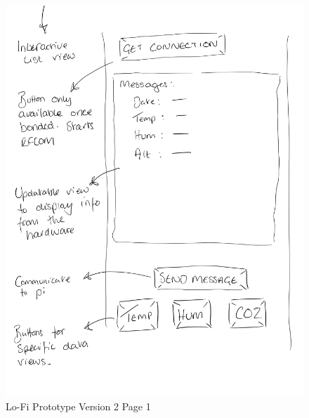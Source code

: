 \documentclass{ueacmpstyle}
\begin{document}
            \begin{figure}[h]
                
                \includegraphics[width=\linewidth]{Images/Lofi_v2_b.jpg}
                \caption{Lo-Fi Prototype Version 2 Page 1}
                \label{Figure Lofi v2 2}
            
            \end{figure}
            \clearpage
            
\end{document}
